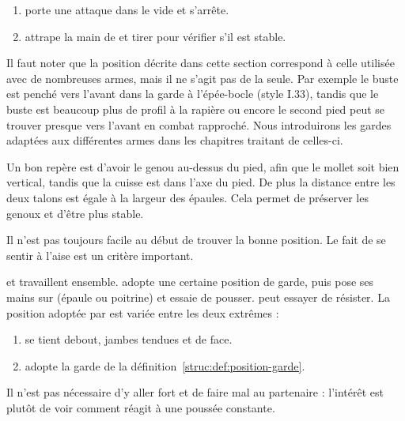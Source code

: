 \begin{exercice}
	\label{struc:ex:stabilité-frappe}


	\begin{enumerate}
		\item \A porte une attaque dans le vide et s'arrête.
		
		\item \D attrape la main de \A et tirer pour vérifier s'il est stable.
	\end{enumerate}
\end{exercice}


Il faut noter que la position décrite dans cette section correspond à celle utilisée avec de nombreuses armes, mais il ne s'agit pas de la seule.
Par exemple le buste est penché vers l'avant dans la garde à l'épée-bocle (style I.33), tandis que le buste est beaucoup plus de profil à la rapière ou encore le second pied peut se trouver presque vers l'avant en combat rapproché.
Nous introduirons les gardes adaptées aux différentes armes dans les chapitres traitant de celles-ci.

Un bon repère est d'avoir le genou au-dessus du pied, afin que le mollet soit bien vertical, tandis que la cuisse est dans l'axe du pied.
De plus la distance entre les deux talons est égale à la largeur des épaules.
Cela permet de préserver les genoux et d'être plus stable.

Il n'est pas toujours facile au début de trouver la bonne position.
Le fait de se sentir à l'aise est un critère important.


\begin{exercice}
	\label{struc:ex:test-position}
	


	\A et \D travaillent ensemble.
	\D adopte une certaine position de garde, puis \A pose ses mains sur \D (épaule ou poitrine) et essaie de pousser.
	\D peut essayer de résister.
	La position adoptée par \D est variée entre les deux extrêmes :
	\begin{enumerate}
		\item \D se tient debout, jambes tendues et de face.
		\item \D adopte la garde de la définition~\ref{struc:def:position-garde}.
	\end{enumerate}

	Il n'est pas nécessaire d'y aller fort et de faire mal au partenaire : l'intérêt est plutôt de voir comment \D réagit à une poussée constante.
\end{exercice}


